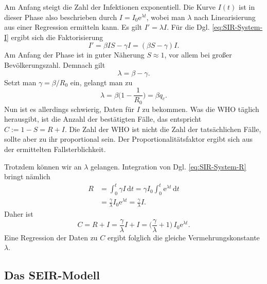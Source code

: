 \documentclass[a4paper,11pt,fleqn,twocolumn,twoside,dvipdfmx]{scrartcl}
\numberwithin{equation}{section}
\newcommand{\ee}{\mathrm e}
\begin{document}
Am Anfang steigt die Zahl der Infektionen exponentiell. Die Kurve
$I(t)$ ist in dieser Phase also beschrieben durch
$I=I_0\ee^{\lambda t}$, wobei man $\lambda$ nach Linearisierung aus
einer Regression ermitteln kann. Es gilt $I'=\lambda I$. Für die
Dgl. \eqref{eq:SIR-System-I} ergibt sich die Faktorisierung%
\begin{equation}
I' = \beta IS-\gamma I = (\beta S-\gamma)I.
\end{equation}
Am Anfang der Phase ist in guter Näherung $S\approx 1$, vor allem bei
großer Bevölkerungszahl. Demnach gilt%
\begin{equation}\label{eq:lambda-beta-gamma}
\lambda = \beta-\gamma.
\end{equation}
Setzt man $\gamma=\beta/R_0$ ein, gelangt man zu%
\begin{equation}
\lambda = \beta\Big(1-\frac{1}{R_0}\Big) = \beta q_c.
\end{equation}
Nun ist es allerdings schwierig, Daten für $I$ zu bekommen. Was die
WHO täglich herausgibt, ist die Anzahl der bestätigten Fälle, das
entspricht $C:=1-S=R+I$. Die Zahl der WHO ist nicht die Zahl der
tatsächlichen Fälle, sollte aber zu ihr proportional sein. Der
Proportionalitätsfaktor ergibt sich aus der ermittelten
Fallsterblichkeit.

Trotzdem können wir an $\lambda$ gelangen. Integration von Dgl.
\eqref{eq:SIR-System-R} bringt nämlich%
\begin{align}
R &= \int_0^t \gamma I\,\mathrm dt
= \gamma I_0 \int_0^t \ee^{\lambda t}\,\mathrm dt\\
&= \frac{\gamma}{\lambda} I_0\ee^{\lambda t} = \frac{\gamma}{\lambda} I.
\end{align}
Daher ist
\begin{equation}
C = R+I = \frac{\gamma}{\lambda} I+I
= \Big(\frac{\gamma}{\lambda}+1\Big)\,I_0\ee^{\lambda t}.
\end{equation}
Eine Regression der Daten zu $C$ ergibt folglich die gleiche
Vermehrungskonstante $\lambda$.

\subsection{Das SEIR-Modell}
\end{document}
